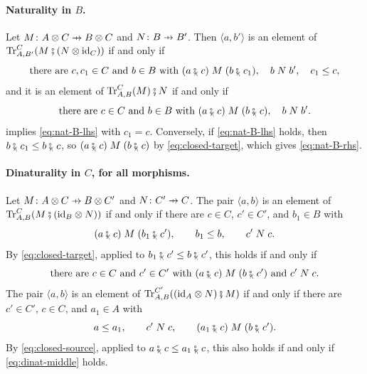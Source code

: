 \documentclass[11pt,a4paper]{article}
\theoremstyle{plain}
\theoremstyle{definition}
\theoremstyle{remark}
\newcommand{\then}{\mathbin{\fatsemi}}
\newcommand{\tc}{\mathbin{\fatsemi_{\!\scriptscriptstyle\langle}}}
\newcommand{\tup}[1]{\langle #1 \rangle}
\newcommand{\profto}{\mathrel{\ooalign{\hfil$\mapstochar\mkern 5mu$\hfil\cr$\to$\cr}}}
\newcommand{\rel}[3]{#1 \mathrel{#2} #3}
\DeclareMathOperator{\Tr}{Tr}
\newcommand{\id}{\mathrm{id}}
\begin{document}
\paragraph{Naturality in $B$.}
Let $M \colon A \otimes C \profto B \otimes C$ and $N \colon B \profto B'$.
Then $\tup{a, b'}$ is an element of $\Tr^{C}_{A,B'}(M \then (N \otimes \id_C))$ if and only if
\begin{equation}
    \label{eq:nat-B-lhs}
    \text{there are } c, c_1 \in C \text{ and } b \in B \text{ with } \rel{(a \tc c)}{M}{(b \tc c_1)}, \quad \rel{b}{N}{b'}, \quad c_1 \leq c,
\end{equation}
and it is an element of $\Tr^{C}_{A,B}(M) \then N$ if and only if
\begin{equation}
    \label{eq:nat-B-rhs}
    \text{there are } c \in C \text{ and } b \in B \text{ with } \rel{(a \tc c)}{M}{(b \tc c)}, \quad \rel{b}{N}{b'}.
\end{equation}
 implies \cref{eq:nat-B-lhs} with $c_1 = c$.
Conversely, if \cref{eq:nat-B-lhs} holds, then $b \tc c_1 \leq b \tc c$, so $\rel{(a \tc c)}{M}{(b \tc c)}$ by \cref{eq:closed-target}, which gives \cref{eq:nat-B-rhs}.

\paragraph{Dinaturality in $C$, for all morphisms.}
Let $M \colon A \otimes C \profto B \otimes C'$ and $N \colon C' \profto C$.
The pair $\tup{a,b}$ is an element of $\Tr^{C}_{A,B}(M \then (\id_B \otimes N))$ if and only if there are $c \in C$, $c' \in C'$, and $b_1 \in B$ with
\begin{equation*}
    \rel{(a \tc c)}{M}{(b_1 \tc c')}, \qquad b_1 \leq b, \qquad \rel{c'}{N}{c}.
\end{equation*}
By \cref{eq:closed-target}, applied to $b_1 \tc c' \leq b \tc c'$, this holds if and only if
\begin{equation}
    \label{eq:dinat-middle}
    \text{there are } c \in C \text{ and } c' \in C' \text{ with } \rel{(a \tc c)}{M}{(b \tc c')} \text{ and } \rel{c'}{N}{c}.
\end{equation}
The pair $\tup{a,b}$ is an element of $\Tr^{C'}_{A,B}((\id_A \otimes N) \then M)$ if and only if there are $c' \in C'$, $c \in C$, and $a_1 \in A$ with
\begin{equation*}
    a \leq a_1, \qquad \rel{c'}{N}{c}, \qquad \rel{(a_1 \tc c)}{M}{(b \tc c')}.
\end{equation*}
By \cref{eq:closed-source}, applied to $a \tc c \leq a_1 \tc c$, this also holds if and only if \cref{eq:dinat-middle} holds.
\end{document}
